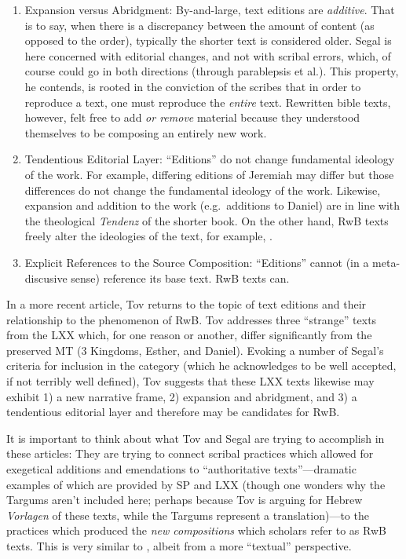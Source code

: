  \begin{enumerate} \def\labelenumi{\arabic{enumi}.} \setcounter{enumi}{3} \item   Expansion versus Abridgment: By-and-large, text editions are   \emph{additive}. That is to say, when there is a discrepancy between   the amount of content (as opposed to the order), typically the shorter   text is considered older. Segal is here concerned with editorial   changes, and not with scribal errors, which, of course could go in   both directions (through parablepsis et al.). This property, he   contends, is rooted in the conviction of the scribes that in order to   reproduce a text, one must reproduce the \emph{entire}   text.\autocite[24]{segal_henze2005} Rewritten bible texts, however,   felt free to add \emph{or remove} material because they understood   themselves to be composing an entirely new   work.\autocite[24]{segal_henze2005} \item   Tendentious Editorial Layer: ``Editions'' do not change fundamental   ideology of the work. For example, differing editions of Jeremiah may   differ but those differences do not change the fundamental ideology of   the work. Likewise, expansion and addition to the work (e.g.~additions   to Daniel) are in line with the theological \emph{Tendenz} of the   shorter book. On the other hand, RwB texts freely alter the ideologies   of the text, for example,   \jub.\autocite[25]{segal_henze2005} \item   Explicit References to the Source Composition: ``Editions'' cannot (in   a meta-discusive sense) reference its base text. RwB texts can. \end{enumerate} 

 In a more recent article, Tov returns to the topic of text editions and their relationship to the phenomenon of RwB\autocite{tov_krarrer-kraus2008}. Tov addresses three ``strange'' texts from the LXX which, for one reason or another, differ significantly from the preserved MT (3 Kingdoms, Esther, and Daniel). Evoking a number of Segal's criteria\autocite{segal_henze2005} for inclusion in the category (which he acknowledges to be well accepted, if not terribly well defined), Tov suggests that these LXX texts likewise may exhibit 1) a new narrative frame, 2) expansion and abridgment, and 3) a tendentious editorial layer and therefore may be candidates for RwB. 

 It is important to think about what Tov and Segal are trying to accomplish in these articles: They are trying to connect scribal practices which allowed for exegetical additions and emendations to ``authoritative texts''---dramatic examples of which are provided by SP and LXX (though one wonders why the Targums aren't included here; perhaps because Tov is arguing for Hebrew \emph{Vorlagen} of these texts, while the Targums represent a translation)---to the practices which produced the \emph{new compositions} which scholars refer to as RwB texts. This is very similar to \vermes, albeit from a more ``textual'' perspective. 

